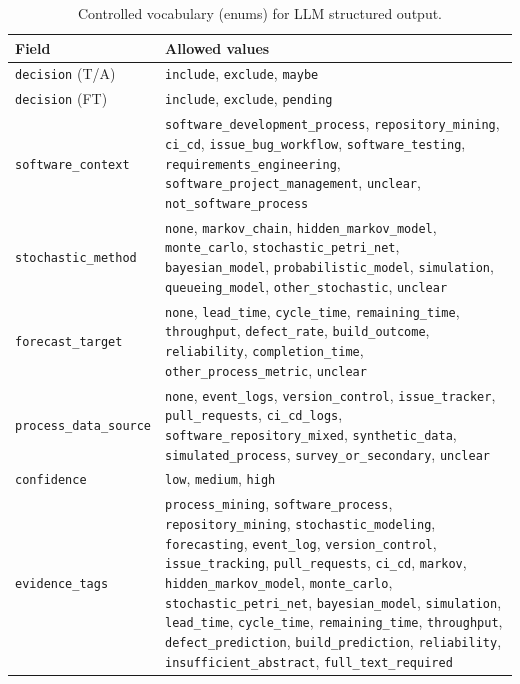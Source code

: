 \begin{table}[htbp]
\centering
\caption{Controlled vocabulary (enums) for LLM structured output.}
\label{tab:app-enum-schema}
\small
\setlength{\tabcolsep}{4pt}
\begin{tabular}{p{3.2cm} p{9.4cm}}
\toprule
\textbf{Field} & \textbf{Allowed values} \\
\midrule
\texttt{decision} (T/A) &
  \texttt{include}, \texttt{exclude}, \texttt{maybe} \\
\texttt{decision} (FT) &
  \texttt{include}, \texttt{exclude}, \texttt{pending} \\
\texttt{software\_context} &
  \texttt{software\_development\_process}, \texttt{repository\_mining},
  \texttt{ci\_cd}, \texttt{issue\_bug\_workflow}, \texttt{software\_testing},
  \texttt{requirements\_engineering}, \texttt{software\_project\_management},
  \texttt{unclear}, \texttt{not\_software\_process} \\
\texttt{stochastic\_method} &
  \texttt{none}, \texttt{markov\_chain}, \texttt{hidden\_markov\_model},
  \texttt{monte\_carlo}, \texttt{stochastic\_petri\_net},
  \texttt{bayesian\_model}, \texttt{probabilistic\_model},
  \texttt{simulation}, \texttt{queueing\_model},
  \texttt{other\_stochastic}, \texttt{unclear} \\
\texttt{forecast\_target} &
  \texttt{none}, \texttt{lead\_time}, \texttt{cycle\_time},
  \texttt{remaining\_time}, \texttt{throughput}, \texttt{defect\_rate},
  \texttt{build\_outcome}, \texttt{reliability},
  \texttt{completion\_time}, \texttt{other\_process\_metric},
  \texttt{unclear} \\
\texttt{process\_data\_source} &
  \texttt{none}, \texttt{event\_logs}, \texttt{version\_control},
  \texttt{issue\_tracker}, \texttt{pull\_requests}, \texttt{ci\_cd\_logs},
  \texttt{software\_repository\_mixed}, \texttt{synthetic\_data},
  \texttt{simulated\_process}, \texttt{survey\_or\_secondary},
  \texttt{unclear} \\
\texttt{confidence} &
  \texttt{low}, \texttt{medium}, \texttt{high} \\
\texttt{evidence\_tags} &
  \texttt{process\_mining}, \texttt{software\_process},
  \texttt{repository\_mining}, \texttt{stochastic\_modeling},
  \texttt{forecasting}, \texttt{event\_log}, \texttt{version\_control},
  \texttt{issue\_tracking}, \texttt{pull\_requests}, \texttt{ci\_cd},
  \texttt{markov}, \texttt{hidden\_markov\_model}, \texttt{monte\_carlo},
  \texttt{stochastic\_petri\_net}, \texttt{bayesian\_model},
  \texttt{simulation}, \texttt{lead\_time}, \texttt{cycle\_time},
  \texttt{remaining\_time}, \texttt{throughput}, \texttt{defect\_prediction},
  \texttt{build\_prediction}, \texttt{reliability},
  \texttt{insufficient\_abstract}, \texttt{full\_text\_required} \\
\bottomrule
\end{tabular}
\end{table}



